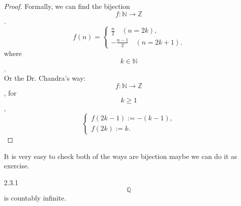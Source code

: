 \documentclass[a4paper]{article}
\def\qq{{\mathbb Q}}
\begin{document}
\begin{proof}  Formally, we can find the bijection $$f:\mathbb{N}\rightarrow \mathbb{Z}$$.
            \begin{equation*}
                f(n)=\begin{cases}
                    \frac{n}{2} \quad (n=2k),\\
                    -\frac{n-1}{2} \quad (n=2k+1).
                    \end{cases}
            \end{equation*}where $$k \in \mathbb{N}$$.\\
            Or the Dr. Chandra's way:
            $$f:\mathbb{N} \rightarrow \mathbb{Z}$$, for $$k \geq 1$$,
            \begin{equation*}
                \begin{cases}
                    f(2k-1):=-(k-1),\\
                    f(2k):=k.
                \end{cases}
            \end{equation*}
\end{proof}
            It is very easy to check both of the ways are bijection maybe we can do it as exercise.
\begin{theorem}{2.3.1}{}
    $$\qq$$ is countably infinite.
\end{theorem}
\end{document}
